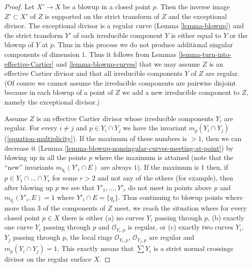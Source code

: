 \begin{proof}
Let $X' \to X$ be a blowup in a closed point $p$. Then the inverse image
$Z' \subset X'$ of $Z$ is supported on the strict transform of $Z$ and
the exceptional divisor. The exceptional divisor is a regular curve
(Lemma \ref{lemma-blowup}) and the strict transform $Y'$ of each irreducible
component $Y$ is either equal to $Y$ or the blowup of $Y$ at $p$.
Thus in this process we do not produce additional singular components
of dimension $1$. Thus it follows from
Lemmas \ref{lemma-turn-into-effective-Cartier} and \ref{lemma-blowup-curves}
that we may assume $Z$ is an effective Cartier divisor and
that all irreducible components $Y$ of $Z$ are regular.
(Of course we cannot assume the irreducible components are
pairwise disjoint because in each blowup of a point of $Z$
we add a new irreducible component to $Z$, namely the exceptional divisor.)

\medskip\noindent
Assume $Z$ is an effective Cartier divisor whose irreducible components
$Y_i$ are regular. For every $i \not = j$
and $p \in Y_i \cap Y_j$ we have the invariant
$m_p(Y_i \cap Y_j)$ (\ref{equation-multiplicity}).
If the maximum of these numbers is $> 1$, then we can decrease
it (Lemma \ref{lemma-blowup-nonsingular-curves-meeting-at-point})
by blowing up in all the points $p$ where the maximum is attained
(note that the ``new'' invariants $m_{q_i}(Y'_i \cap E)$ are always $1$).
If the maximum is $1$ then, if $p \in Y_1 \cap \ldots \cap Y_r$
for some $r > 2$ and not any of the others (for example), then after
blowing up $p$ we see that $Y'_1, \ldots, Y'_r$ do not meet in points
above $p$ and $m_{q_i}(Y'_i, E) = 1$ where $Y'_i \cap E = \{q_i\}$.
Thus continuing to blowup points where more than $3$
of the components of $Z$ meet, we reach the situation where
for every closed point $p \in X$ there is either
(a) no curves $Y_i$ passing through $p$,
(b) exactly one curve $Y_i$ passing through $p$ and $\mathcal{O}_{Y_i, p}$
is regular, or (c) exactly two curves $Y_i$, $Y_j$ passing through
$p$, the local rings $\mathcal{O}_{Y_i, p}$, $\mathcal{O}_{Y_j, p}$
are regular and $m_p(Y_i \cap Y_j) = 1$.
This exactly means that $\sum Y_i$ is a strict normal crossings
divisor on the regular surface $X$.
\end{proof}
















